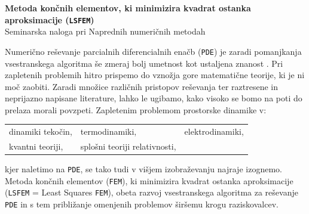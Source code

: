 \begin{center}
	\textbf{\LARGE{Metoda končnih elementov, ki minimizira kvadrat ostanka aproksimacije (\texttt{LSFEM})}}\\[0.25cm]
	\large{Seminarska naloga pri Naprednih numeričnih metodah}\\[0.7cm]
\end{center}

Numerično reševanje parcialnih diferencialnih enačb (\texttt{PDE}) je zaradi pomanjkanja vsestranskega algoritma še zmeraj bolj umetnost kot ustaljena znanost \cite{JiangB-LSFEM}. Pri zapletenih problemih hitro prispemo do vznožja gore matematične teorije, ki je ni moč zaobiti. Zaradi množice različnih pristopov reševanja ter raztresene in neprijazno napisane literature, lahko le ugibamo, kako visoko se bomo na poti do prelaza morali povzpeti. Zapletenim problemom prostorske dinamike v:
\begin{center}
	\begin{tabular}[h]{lll}
		\tabitem dinamiki tekočin,\hspace{1cm}	&	\tabitem termodinamiki,\hspace{2.5cm}	&	\tabitem elektrodinamiki,\\
		\tabitem kvantni teoriji,	&	\tabitem splošni teoriji relativnosti,&	\\
	\end{tabular}
\end{center}
kjer naletimo na \texttt{PDE}, se tako tudi v višjem izobraževanju najraje izognemo. Metoda končnih elementov (\texttt{FEM}), ki minimizira kvadrat ostanka aproksimacije (\texttt{LSFEM} = Least Squares \texttt{FEM}), obeta razvoj vsestranskega algoritma za reševanje \texttt{PDE} in s tem približanje omenjenih problemov širšemu krogu raziskovalcev.

